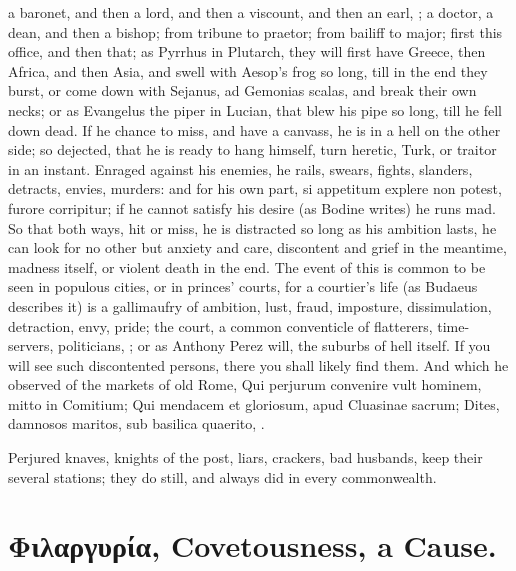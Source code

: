 {a baronet, and then a lord, and then a viscount, and then an earl, \etc{};
a doctor, a dean, and then a bishop; from tribune to praetor; from
bailiff to major; first this office, and then that; as Pyrrhus in
Plutarch, they will first have Greece, then Africa, and then
Asia, and swell with Aesop's frog so long, till in the end they burst,
or come down with Sejanus, ad Gemonias scalas, and break their own
necks; or as Evangelus the piper in Lucian, that blew his pipe so long,
till he fell down dead. If he chance to miss, and have a canvass, he is
in a hell on the other side; so dejected, that he is ready to hang
himself, turn heretic, Turk, or traitor in an instant. Enraged against
his enemies, he rails, swears, fights, slanders, detracts, envies,
murders: and for his own part, si appetitum explere non potest, furore
corripitur; if he cannot satisfy his desire (as Bodine writes) he
runs mad. So that both ways, hit or miss, he is distracted so long as
his ambition lasts, he can look for no other but anxiety and care,
discontent and grief in the meantime, madness itself, or violent
death in the end. The event of this is common to be seen in populous
cities, or in princes' courts, for a courtier's life (as Budaeus
describes it) is a gallimaufry of ambition, lust, fraud,
imposture, dissimulation, detraction, envy, pride; the court, a
common conventicle of flatterers, time-servers, politicians, \etc{}; or as
 Anthony Perez will, the suburbs of hell itself. If you will see
such discontented persons, there you shall likely find them. And
which he observed of the markets of old Rome,
Qui perjurum convenire vult hominem, mitto in Comitium;
Qui mendacem et gloriosum, apud Cluasinae sacrum;
Dites, damnosos maritos, sub basilica quaerito, \etc{}.

Perjured knaves, knights of the post, liars, crackers, bad husbands,
\etc{} keep their several stations; they do still, and always did in every
commonwealth.

\section{Φιλαργυρία, Covetousness, a Cause.}

}
